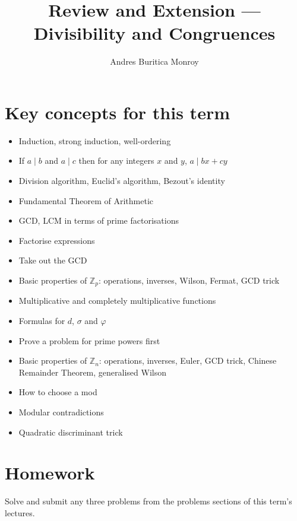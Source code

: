 \documentclass{article}
\title{Review and Extension --- Divisibility and Congruences}
\author{Andres Buritica Monroy}
\date{}
\begin{document}
\maketitle
\section{Key concepts for this term}
  \begin{itemize}
    \item Induction, strong induction, well-ordering
    \item If $a\mid b$ and $a\mid c$ then for any integers $x$ and $y$, $a\mid
      bx+cy$
    \item Division algorithm, Euclid's algorithm, Bezout's identity
    \item Fundamental Theorem of Arithmetic
    \item GCD, LCM in terms of prime factorisations
    \item Factorise expressions
    \item Take out the GCD
    \item Basic properties of $\mathbb Z_p$: operations, inverses, Wilson,
      Fermat, GCD trick
    \item Multiplicative and completely multiplicative functions
    \item Formulas for $d$, $\sigma$ and $\varphi$
    \item Prove a problem for prime powers first
    \item Basic properties of $\mathbb Z_n$: operations, inverses, 
      Euler, GCD trick, Chinese Remainder Theorem, generalised Wilson
    \item How to choose a mod
    \item Modular contradictions
    \item Quadratic discriminant trick
  \end{itemize}
\section{Homework}
  Solve and submit any three problems from the problems sections of this term's
  lectures.
\newpage
\end{document}

